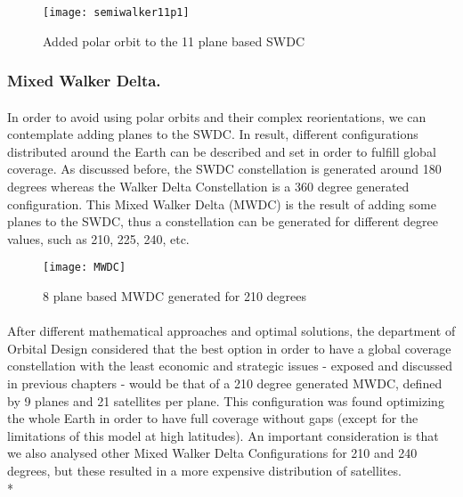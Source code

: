\documentclass{article}
\begin{document}
\begin{figure}[h]
\texttt{[image: semiwalker11p1]}
\centering
\caption{Added polar orbit to the 11 plane based SWDC}
\end{figure}

\subsubsection{Mixed Walker Delta.}
\paragraph{ }
In order to avoid using polar orbits and their complex reorientations, we can contemplate adding planes to the SWDC. In result, different configurations distributed around the Earth can be described and set in order to fulfill global coverage. As discussed before, the SWDC constellation is generated around 180 degrees whereas the Walker Delta Constellation is a 360 degree generated configuration. This Mixed Walker Delta (MWDC) is the result of adding some planes to the SWDC, thus a constellation can be generated for different degree values, such as 210, 225, 240, etc. 

\begin{figure}[h]
\texttt{[image: MWDC]}
\centering
\caption{8 plane based MWDC generated for 210 degrees}
\end{figure}

\paragraph{ }


After different mathematical approaches and optimal solutions, the department of Orbital Design considered that the best option in order to have a global coverage constellation with the least economic and strategic issues - exposed and discussed in previous chapters - would be that of a 210 degree generated MWDC, defined by 9 planes and 21 satellites per plane. This configuration was found optimizing the whole Earth in order to have full coverage without gaps (except for the limitations of this model at high latitudes). An important consideration is that we also analysed other Mixed Walker Delta Configurations for 210 and 240 degrees, but these resulted in a more expensive distribution of satellites.  \\*
\end{document}
